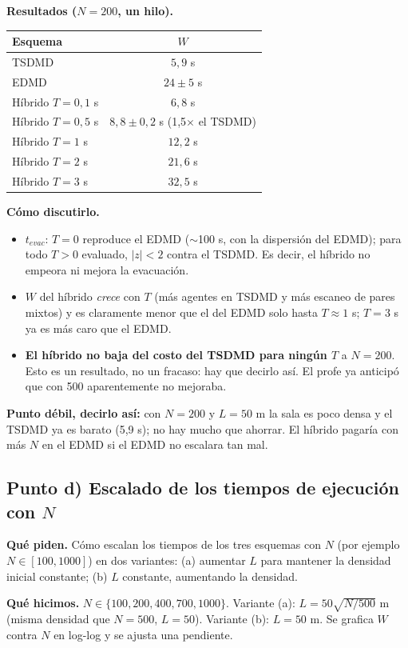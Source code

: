 \documentclass[10.5pt,a4paper]{article}
\newcommand{\debil}[1]{\par\colorbox{deb}{\parbox{\dimexpr\linewidth-2\fboxsep}{\textbf{Punto débil, decirlo así:} #1}}\par}
\begin{document}
\textbf{Resultados ($N=200$, un hilo).}
\begin{center}\small
\begin{tabular}{@{}lc@{}}
\toprule
Esquema & $W$ \\ \midrule
TSDMD & $5{,}9$ s \\
EDMD & $24\pm5$ s \\
Híbrido $T=0{,}1$ s & $6{,}8$ s \\
Híbrido $T=0{,}5$ s & $8{,}8\pm0{,}2$ s (1,5$\times$ el TSDMD) \\
Híbrido $T=1$ s & $12{,}2$ s \\
Híbrido $T=2$ s & $21{,}6$ s \\
Híbrido $T=3$ s & $32{,}5$ s \\ \bottomrule
\end{tabular}
\end{center}
\textbf{Cómo discutirlo.}
\begin{itemize}
\item $t_{evac}$: $T=0$ reproduce el EDMD ($\sim$100 s, con la dispersión del EDMD); para todo $T>0$ evaluado, $|z|<2$ contra el TSDMD. Es decir, el híbrido no empeora ni mejora la evacuación.
\item $W$ del híbrido \emph{crece} con $T$ (más agentes en TSDMD y más escaneo de pares mixtos) y es claramente menor que el del EDMD solo hasta $T\approx1$ s; $T=3$ s ya es más caro que el EDMD.
\item \textbf{El híbrido no baja del costo del TSDMD para ningún $T$} a $N=200$. Esto es un resultado, no un fracaso: hay que decirlo así. El profe ya anticipó que con 500 aparentemente no mejoraba.
\end{itemize}
\debil{con $N=200$ y $L=50$ m la sala es poco densa y el TSDMD ya es barato (5,9 s); no hay mucho que ahorrar. El híbrido pagaría con más $N$ en el EDMD si el EDMD no escalara tan mal.}

\subsection{Punto d) Escalado de los tiempos de ejecución con $N$}
\textbf{Qué piden.} Cómo escalan los tiempos de los tres esquemas con $N$ (por ejemplo $N\in[100,1000]$) en dos variantes: (a) aumentar $L$ para mantener la densidad inicial constante; (b) $L$ constante, aumentando la densidad.

\textbf{Qué hicimos.} $N\in\{100,200,400,700,1000\}$. Variante (a): $L=50\sqrt{N/500}$ m (misma densidad que $N=500$, $L=50$). Variante (b): $L=50$ m. Se grafica $W$ contra $N$ en log-log y se ajusta una pendiente.
\end{document}
